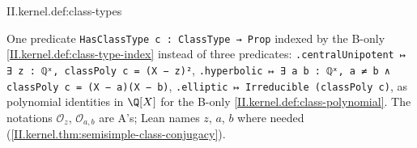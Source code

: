 \begin{definition}
\end{definition}
\begin{tfformal}{II.kernel.def:class-types}
\begin{tffidelity}
One predicate \texttt{HasClassType c : ClassType → Prop} indexed by the B-only \cref{II.kernel.def:class-type-index} instead of three predicates: \texttt{.centralUnipotent ↦ ∃ z : ℚˣ, classPoly c = (X − z)²}, \texttt{.hyperbolic ↦ ∃ a b : ℚˣ, a ≠ b ∧ classPoly c = (X − a)(X − b)}, \texttt{.elliptic ↦ Irreducible (classPoly c)}, as polynomial identities in $\Q[X]$ for the B-only \cref{II.kernel.def:class-polynomial}. The notations $\mathcal O_z$, $\mathcal O_{a,b}$ are A's; Lean names $z$, $a$, $b$ where needed (\cref{II.kernel.thm:semisimple-class-conjugacy}).
\end{tffidelity}
\end{tfformal}


